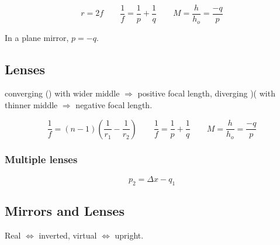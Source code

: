 \[
	r = 2f \qquad
	\frac{1}{f} = \frac{1}{p} + \frac{1}{q} \qquad
	M = \frac{h}{h_o} = \frac{-q}{p}
\]

In a plane mirror, $p = -q$.

\subsection{Lenses}

converging () with wider middle $\Rightarrow$ positive focal length, diverging )( with thinner middle $\Rightarrow$ negative focal length.

\[
	\frac{1}{f} = (n-1)(\frac{1}{r_1} - \frac{1}{r_2}) \qquad
	\frac{1}{f} = \frac{1}{p} + \frac{1}{q} \qquad
	M = \frac{h}{h_o} = \frac{-q}{p}
\]

\subsubsection{Multiple lenses}

\[
	p_2 = \Delta x - q_1
\]

\subsection{Mirrors and Lenses}


Real $\iff$ inverted, virtual $\iff$ upright.

